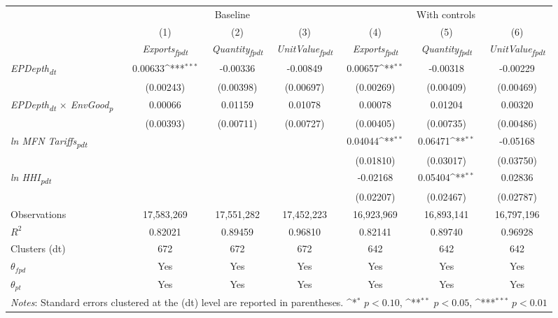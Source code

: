 {
\def\sym#1{\ifmmode^{#1}\else\(^{#1}\)\fi}
\begin{tabular}{l*{6}{c}}
\toprule
&\multicolumn{3}{c}{Baseline}&\multicolumn{3}{c}{With controls}\\\cmidrule(lr){2-4}\cmidrule(lr){5-7}
&(1)&(2)&(3)&(4)&(5)&(6)\\
&\textit{Exports\textsubscript{fpdt}}&\textit{Quantity\textsubscript{fpdt}}&\textit{UnitValue\textsubscript{fpdt}}&\textit{Exports\textsubscript{fpdt}}&\textit{Quantity\textsubscript{fpdt}}&\textit{UnitValue\textsubscript{fpdt}}\\
\midrule
\textit{EPDepth\textsubscript{dt}} & 0.00633\sym{***} & -0.00336 & -0.00849 & 0.00657\sym{**} & -0.00318 & -0.00229\\
 & (0.00243) & (0.00398) & (0.00697) & (0.00269) & (0.00409) & (0.00469)\\
\addlinespace
\textit{EPDepth\textsubscript{dt} $\times$ EnvGood\textsubscript{p}} & 0.00066 & 0.01159 & 0.01078 & 0.00078 & 0.01204 & 0.00320\\
 & (0.00393) & (0.00711) & (0.00727) & (0.00405) & (0.00735) & (0.00486)\\
\addlinespace
\textit{ln MFN Tariffs\textsubscript{pdt}} &  &  &  & 0.04044\sym{**} & 0.06471\sym{**} & -0.05168\\
 &  &  &  & (0.01810) & (0.03017) & (0.03750)\\
\addlinespace
\textit{ln HHI\textsubscript{pdt}} &  &  &  & -0.02168 & 0.05404\sym{**} & 0.02836\\
 &  &  &  & (0.02207) & (0.02467) & (0.02787)\\
\midrule
Observations & 17,583,269 & 17,551,282 & 17,452,223 & 16,923,969 & 16,893,141 & 16,797,196\\
$R^{2}$ & 0.82021 & 0.89459 & 0.96810 & 0.82141 & 0.89740 & 0.96928\\
Clusters (dt) & 672 & 672 & 672 & 642 & 642 & 642\\
$\theta_{fpd}$ & Yes & Yes & Yes & Yes & Yes & Yes\\
$\theta_{pt}$ & Yes & Yes & Yes & Yes & Yes & Yes\\
\bottomrule
\multicolumn{7}{l}{\footnotesize \textit{Notes}: Standard errors clustered at the (dt) level are reported in parentheses. \sym{*} \(p<0.10\), \sym{**} \(p<0.05\), \sym{***} \(p<0.01\)}\\
\end{tabular}
}
